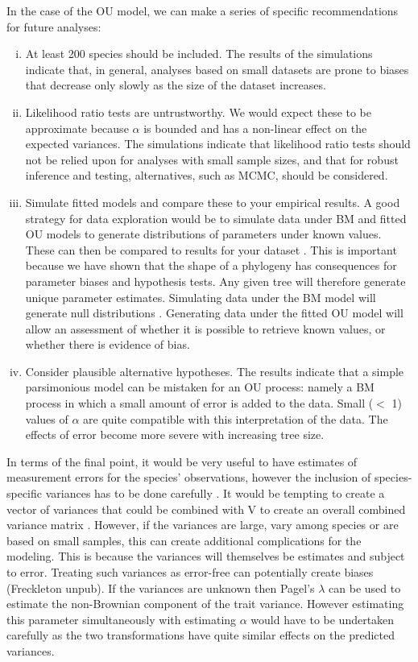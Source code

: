 \documentclass[a4paper,12pt]{article}
\begin{document}
In the case of the OU model, we can make a series of specific recommendations for future analyses:
\begin{enumerate}[(i)]
  \item At least 200 species should be included. The results of the simulations indicate that, in general, analyses based on small datasets are prone to biases that decrease only slowly as the size of the dataset increases.  
  \item Likelihood ratio tests are untrustworthy. We would expect these to be approximate because $\alpha$ is bounded and has a non-linear effect on the expected variances. The simulations indicate that likelihood ratio tests should not be relied upon for analyses with small sample sizes, and that for robust inference and testing, alternatives, such as MCMC, should be considered. 
  \item Simulate fitted models and compare these to your empirical results. A good strategy for data exploration would be to simulate data under BM and fitted OU models to generate distributions of parameters under known values. These can then be compared to results for your dataset \citep[see][for a related approach]{slater2013robust}. This is important because we have shown that the shape of a phylogeny has consequences for parameter biases and hypothesis tests. Any given tree will therefore generate unique parameter estimates. Simulating data under the BM model will generate null distributions \citep[e.g.,][]{boettiger2012your}. Generating data under the fitted OU model will allow an assessment of whether it is possible to retrieve known values, or whether there is evidence of bias. 
  \item Consider plausible alternative hypotheses. The results indicate that a simple parsimonious model can be mistaken for an OU process: namely a BM process in which a small amount of error is added to the data. Small ($<$ 1) values of $\alpha$ are quite compatible with this interpretation of the data. The effects of error become more severe with increasing tree size. 
\end{enumerate}

In terms of the final point, it would be very useful to have estimates of measurement errors for the species’ observations, however the inclusion of species-specific variances has to be done carefully \citep[e.g.,][]{grafen1989phylogenetic}. It would be tempting to create a vector of variances that could be combined with V to create an overall combined variance matrix \citep{o2012evolutionary,Harmon:2010aa}. However, if the variances are large, vary among species or are based on small samples, this can create additional complications for the modeling. This is because the variances will themselves be estimates and subject to error. Treating such variances as error-free can potentially create biases (Freckleton unpub). If the variances are unknown then Pagel’s $\lambda$ \citep{Pagel:1997aa,Pagel:1999aa} can be used to estimate the non-Brownian component of the trait variance. However estimating this parameter simultaneously with estimating $\alpha$ would have to be undertaken carefully as the two transformations have quite similar effects on the predicted variances. 
\end{document}
